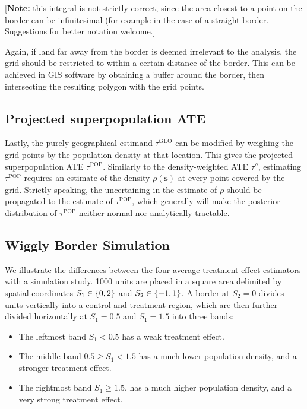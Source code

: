 \documentclass[letter]{article}
\providecommand{\tightlist}{%
      \setlength{\itemsep}{0pt}\setlength{\parskip}{0pt}}
\newcommand{\svec}{\mathbold{s}}
\newcommand{\taurho}{\tau^{\rho}}
\newcommand{\taugeo}{\tau^{\mathrm{GEO}}}
\newcommand{\taupop}{\tau^{\mathrm{POP}}}
\providecommand{\tightlist}{%
  	  \setlength{\itemsep}{0pt}\setlength{\parskip}{0pt}}
\begin{document}
{[}\textbf{Note:} this integral is not strictly correct, since the area closest to a point on the border can be infinitesimal (for example in the case of a straight border. Suggestions for better notation welcome.{]}

Again, if land far away from the border is deemed irrelevant to the analysis, the grid should be restricted to within a certain distance of the border.
This can be achieved in GIS software by obtaining a buffer around the border, then intersecting the resulting polygon with the grid points.
    


    	\subsection{Projected superpopulation ATE}\label{projected-superpopulation-ate}

Lastly, the purely geographical estimand \(\taugeo\) can be modified by weighing the grid points by the population density at that location.
This gives the projected superpopulation ATE \(\taupop\).
Similarly to the density-weighted ATE \(\taurho\), estimating \(\taupop\) requires an estimate of the density \(\rho(\svec)\) at every point covered by the grid.
Strictly speaking, the uncertaining in the estimate of \(\rho\) should be propagated to the estimate of \(\taupop\), which generally will make the posterior distribution of \(\taupop\) neither normal nor analytically tractable.
    


    	\subsection{Wiggly Border Simulation}\label{wiggly-border-simulation}

We illustrate the differences between the four average treatment effect estimators with a simulation study.
1000 units are placed in a square area delimited by spatial coordinates \(S_1 \in \cbr{0,2}\) and \(S_2 \in \cbr{-1, 1}\).
A border at \(S_2=0\) divides units vertically into a control and treatment region,
which are then further divided horizontally at \(S_1=0.5\) and \(S_1=1.5\) into three bands:

\begin{itemize}
\tightlist
\item
  The leftmost band \(S_1 < 0.5\) has a weak treatment effect.
\item
  The middle band \(0.5 \ge S_1 < 1.5\) has a much lower population density, and a stronger treatment effect.
\item
  The rightmost band \(S_1 \ge 1.5\), has a much higher population density, and a very strong treatment effect.
\end{itemize}
\end{document}
